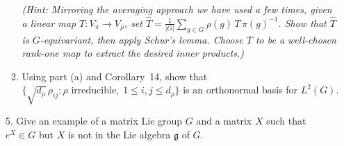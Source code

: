 \documentclass[12pt]{article}
\newcommand{\C}{\mathbb{C}}
\newcommand{\Ad}{\text{Ad}}
\newcommand{\ad}{\text{ad}}
\newcommand{\tr}{\mathrm{tr}}
\begin{document}
\begin{enumerate}
\begin{enumerate}
    \emph{(Hint: Mirroring the averaging approach we have used a few times, given 
    a linear map $T : V_\pi \to V_\rho$, set $\hat{T} = \frac{1}{|G|}\sum_{g 
    \in G} \rho(g)\,T\,\pi(g)^{-1}$. Show that $\hat{T}$ is $G$-equivariant, 
    then apply Schur's lemma. Choose $T$ to be a well-chosen rank-one map to 
    extract the desired inner products.)}

    \item Using part (a) and Corollary~14, show that $\bigl\{\sqrt{d_\rho}\,
    \rho_{ij} : \rho \text{ irreducible},\; 1 \le i,j \le d_\rho\bigr\}$ is an 
    orthonormal basis for $L^2(G)$.
\end{enumerate}

\item[5.] Give an example of a matrix Lie group $G$ and a matrix $X$ such that $e^X\in G$ but $X$ is not in the Lie algebra $\mathfrak{g}$ of $G$.

\end{enumerate}
\end{document}
